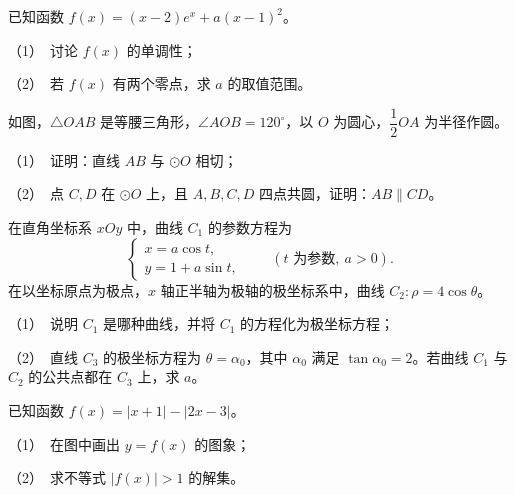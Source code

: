 \begin{question}
已知函数 \(f(x)=(x-2)e^x+a(x-1)^2\)。

   （1）　讨论 \(f(x)\) 的单调性；

   （2）　若 \(f(x)\) 有两个零点，求 \(a\) 的取值范围。

\Needspace{0.4\textheight}
\end{question}
\begin{question}
如图，\(\triangle OAB\) 是等腰三角形，\(\angle AOB=120^\circ\)，以 \(O\) 为圆心，\(\dfrac{1}{2}OA\) 为半径作圆。
\nopagebreak[4]
\begin{center}\end{center}
\nopagebreak[4]
   （1）　证明：直线 \(AB\) 与 \(\odot O\) 相切；

   （2）　点 \(C,D\) 在 \(\odot O\) 上，且 \(A,B,C,D\) 四点共圆，证明：\(AB\parallel CD\)。

\end{question}
\begin{question}
在直角坐标系 \(xOy\) 中，曲线 \(C_1\) 的参数方程为
\nopagebreak[4]
\[
\begin{cases}
x=a\cos t,\\
y=1+a\sin t,
\end{cases}\qquad(t\text{ 为参数},\ a>0).
\]
在以坐标原点为极点，\(x\) 轴正半轴为极轴的极坐标系中，曲线 \(C_2:\rho=4\cos\theta\)。

   （1）　说明 \(C_1\) 是哪种曲线，并将 \(C_1\) 的方程化为极坐标方程；

   （2）　直线 \(C_3\) 的极坐标方程为 \(\theta=\alpha_0\)，其中 \(\alpha_0\) 满足 \(\tan\alpha_0=2\)。若曲线 \(C_1\) 与 \(C_2\) 的公共点都在 \(C_3\) 上，求 \(a\)。

\Needspace{0.4\textheight}
\end{question}
\begin{question}
已知函数 \(f(x)=|x+1|-|2x-3|\)。

   （1）　在图中画出 \(y=f(x)\) 的图象；

   （2）　求不等式 \(|f(x)|>1\) 的解集。
\nopagebreak[4]
\begin{center}\end{center}
\nopagebreak[4]

\end{question}